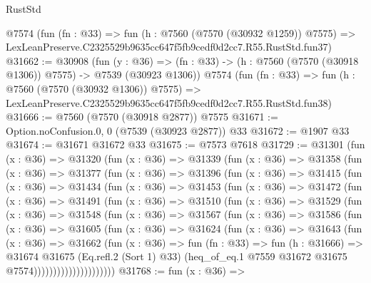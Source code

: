 \begin{lexlean}{RustStd}
\begin{coremodule}
    @7574
    (fun (fn : @33) =>
    fun (h : @7560 (@7570 (@30932 @1259)) @7575) =>
    LexLeanPreserve.C2325529b9635cc647f5fb9cedf0d2cc7.R55.RustStd.fun37)
@31662 := @30908
    (fun (y : @36) =>
    (fn : @33) -> (h : @7560 (@7570 (@30918 @1306)) @7575) -> @7539 (@30923 @1306))
    @7574
    (fun (fn : @33) =>
    fun (h : @7560 (@7570 (@30932 @1306)) @7575) =>
    LexLeanPreserve.C2325529b9635cc647f5fb9cedf0d2cc7.R55.RustStd.fun38)
@31666 := @7560 (@7570 (@30918 @2877)) @7575
@31671 := Option.noConfusion.{0, 0} (@7539 (@30923 @2877)) @33
@31672 := @1907 @33
@31674 := @31671 @31672 @33
@31675 := @7573 @7618
@31729 := @31301
    (fun (x : @36) =>
    @31320
      (fun (x : @36) =>
      @31339
        (fun (x : @36) =>
        @31358
          (fun (x : @36) =>
          @31377
            (fun (x : @36) =>
            @31396
              (fun (x : @36) =>
              @31415
                (fun (x : @36) =>
                @31434
                  (fun (x : @36) =>
                  @31453
                    (fun (x : @36) =>
                    @31472
                      (fun (x : @36) =>
                      @31491
                        (fun (x : @36) =>
                        @31510
                          (fun (x : @36) =>
                          @31529
                            (fun (x : @36) =>
                            @31548
                              (fun (x : @36) =>
                              @31567
                                (fun (x : @36) =>
                                @31586
                                  (fun (x : @36) =>
                                  @31605
                                    (fun (x : @36) =>
                                    @31624
                                      (fun (x : @36) =>
                                      @31643
                                        (fun (x : @36) =>
                                        @31662
                                          (fun (x : @36) =>
                                          fun (fn : @33) =>
                                          fun (h : @31666) =>
                                          @31674
                                            @31675
                                            (Eq.refl.{2} (Sort 1) @33)
                                            (heq_of_eq.{1}
                                              @7559
                                              @31672
                                              @31675
                                              @7574)))))))))))))))))))))
@31768 := fun (x : @36) =>

\end{coremodule}
\end{lexlean}
